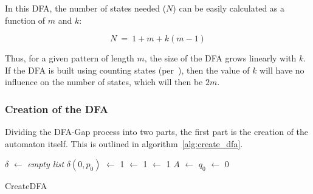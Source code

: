 In this DFA, the number of states needed ($N$) can be easily calculated as a function of $m$ and $k$:

\[N~=~1 + m + k(m - 1)\]

Thus, for a given pattern of length $m$, the size of the DFA grows linearly with $k$. If the DFA is built using counting states (per~\cite{becchi}), then the value of $k$ will have no influence on the number of states, which will then be $2m$.

\subsubsection{Creation of the DFA}

Dividing the DFA-Gap process into two parts, the first part is the creation of the automaton itself. This is outlined in algorithm~\ref{alg:create_dfa}.

\IncMargin{1em}
\begin{algorithm}[ht]
  \DontPrintSemicolon

  \BlankLine
  $\delta$ $\leftarrow$ \textit{empty list}\;
  \;
  $\delta(0, p_0)$ $\leftarrow$ 1\;
  \;
  \State $\leftarrow$ 1\;
  \NewState $\leftarrow$ 1\;
  $A$ $\leftarrow$ \State\;
  $q_0$ $\leftarrow$ 0\;
\caption{CreateDFA}
\label{alg:create_dfa}
\end{algorithm}
\DecMargin{1em}

